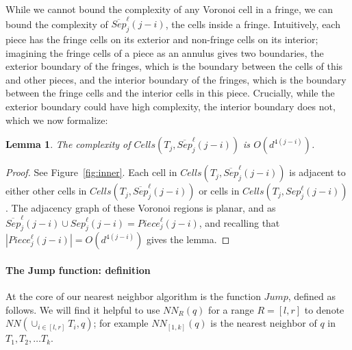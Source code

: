 \documentclass[10pt,a4paper]{amsart}
\newcommand{\Cells}{\mathit{Cells}}
\newcommand{\NN}{\mathit{NN}}
\newcommand{\john}[1]{\textcolor{red}{#1}}
\newcommand{\yakov}[1]{\textcolor{blue}{Yakov: #1}}
\newtheorem{lemma}{Lemma}
\begin{document}
While we cannot bound the complexity of any Voronoi cell in a fringe, we can bound the complexity of $\overline{Sep}_j^\ell(j-i)$, the cells inside a fringe.
Intuitively, each piece has the fringe cells on its exterior and non-fringe cells on its interior; imagining the fringe cells of a piece as an annulus gives two boundaries, the exterior boundary of the fringes, which is the boundary between the cells of this and other pieces, and the interior boundary of the fringes, which is the boundary between the fringe cells and the interior cells in this piece. Crucially, while the exterior boundary could have high complexity, the interior boundary does not, which we now formalize:
\begin{lemma}\label{l:inner}
    The complexity of $\Cells(T_j,\overline{Sep}_j^\ell(j-i))$ is $O(d^{4(j-i)})$. 
\end{lemma}
\begin{proof}
See Figure~\ref{fig:inner}.
    Each cell in $\Cells(T_j,\overline{Sep}_j^\ell(j-i))$ is adjacent to either other cells in $\Cells(T_j,\overline{Sep}_j^\ell(j-i))$ or cells in $\Cells(T_j,{Sep}_j^\ell(j-i))$. The adjacency graph of these Voronoi regions is planar, and as $\overline{Sep}_j^\ell(j-i) \cup {Sep}_j^\ell(j-i)= {Piece}_j^\ell(j-i)$, and recalling that $|{Piece}_j^\ell(j-i)|=O(d^{4(j-i)})$ gives the lemma. %
\end{proof}


\paragraph*{The Jump function: definition} 


At the core of our nearest neighbor algorithm is the function $Jump$, defined as follows. 
We will find it helpful to use $\NN_R(q)$ for a range $R=[l,r]$ to denote $\NN(\cup_{i\in [l,r]}T_i,q)$; for example $\NN_{[1,k]}(q)$ is the nearest neighbor of  $q$ in $T_1,T_2,\ldots T_k$. 
\end{document}
